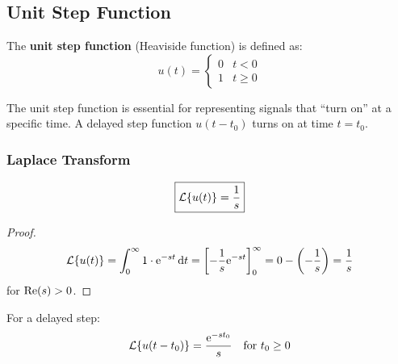 \subsection{Unit Step Function}

\begin{definitionbox}[title=Definition 10.2: Unit Step Function]
The \textbf{unit step function} (Heaviside function) is defined as:
\begin{equation}
u(t) = \begin{cases} 0 & t < 0 \\ 1 & t \geq 0 \end{cases}
\end{equation}
\end{definitionbox}

The unit step function is essential for representing signals that ``turn on'' at a specific time. A delayed step function $u(t-t_0)$ turns on at time $t = t_0$.

\subsubsection{Laplace Transform}

\begin{equation}
\boxed{\mathcal{L}\{u(t)\} = \frac{1}{s}}
\end{equation}

\begin{proof}
\begin{equation}
\mathcal{L}\{u(t)\} = \int_0^\infty 1 \cdot \mathrm{e}^{-st} \, \mathrm{d} t = \left[-\frac{1}{s}\mathrm{e}^{-st}\right]_0^\infty = 0 - \left(-\frac{1}{s}\right) = \frac{1}{s}
\end{equation}
for $\operatorname{Re}(s) > 0$.
\end{proof}

For a delayed step:
\begin{equation}
\mathcal{L}\{u(t-t_0)\} = \frac{\mathrm{e}^{-st_0}}{s} \quad \text{for } t_0 \geq 0
\end{equation}

